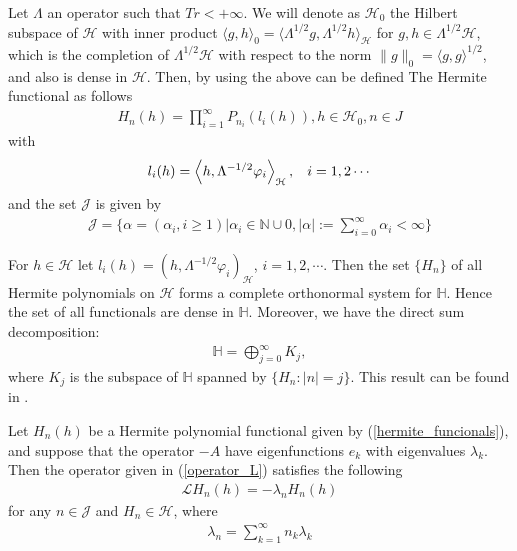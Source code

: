 	Let $\Lambda$ an operator such that $Tr < +\infty$. We will denote as $\mathcal{H}_0$ the Hilbert subspace of $\mathcal{H}$ with inner product $\langle g, h \rangle_0 = \langle \Lambda^{1/2} g, \Lambda^{1/2} h \rangle_{\mathcal{H}}$ for $g, h \in \Lambda^{1/2} \mathcal{H}$, which is the completion of $\Lambda^{1/2} \mathcal{H}$ with respect to the norm $\| g \|_0 = \langle g, g \rangle^{1/2}$, and also is dense in $\mathcal{H}$. Then, by using the above can be defined The Hermite functional as follows
	\begin{align}
	\label{hermite_funcionals}
		H_n(h) = \prod_{i=1}^{\infty} P_{n_i} (l_i (h)), h \in \mathcal{H}_0 , n \in J
	\end{align}
	with
	\begin{equation*}
		l_i (h) = \left\langle h, \Lambda^{-1/2} \varphi_i \right\rangle_{\mathcal{H}}, \hspace{3mm} i = 1,2 \cdots
	\end{equation*}
	and the set $\mathcal{J}$ is given by
	\begin{align}
	\label{Conjunto_J}	
		\mathcal{J} = \{\alpha = (\alpha_i,i \geq 1) | \alpha_i \in \mathbb{N}\cup {0}, |\alpha|:= \displaystyle \sum _{i = 0}^{\infty}\alpha_i < \infty\}
	\end{align}
	

	\begin{lemma}
	\label{dense}	
		For $h \in \mathcal{H}$ let $l_i (h) = (h, \Lambda^{-1/2} \varphi_i )_{\mathcal{H}}$, $i=1, 2, \cdots$. Then the set $\{H_n \}$ of all Hermite polynomials on $\mathcal{H}$ forms a complete orthonormal system for $\mathbb{H}$. Hence the set of all functionals are dense in $\mathbb{H}$. Moreover, we have the direct sum decomposition:
		\begin{align*}
		\mathbb{H} = \displaystyle \bigoplus^{\infty}_{j=0} K_j,
		\end{align*}
		where $K_j$ is the subspace of $\mathbb{H}$ spanned by $\{H_n : |n| = j \}$. This result can be found in \cite{DAPRATO1994}.
	\end{lemma}


	\begin{lemma}
		\label{eigen}
		Let $H_n (h)$ be a Hermite polynomial functional given by (\ref{hermite_funcionals}), and suppose that the operator $-A$ have eigenfunctions $e_k$ with eigenvalues $\lambda_k$. Then the operator given in (\ref{operator_L}) satisfies the following
		\begin{align}
			\label{eigen_lambda_kolmo}
			\mathcal{L} H_n (h) = - \lambda_n H_n (h)
		\end{align}
		for any $n \in \mathcal{J}$ and $H_n \in \mathcal{H}$, where
		\begin{align*}
			\lambda_n = \displaystyle \sum_{k=1}^{\infty} n_k \lambda_k
		\end{align*}
	\end{lemma}